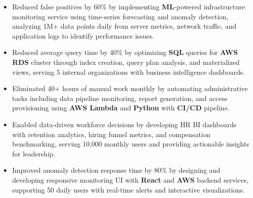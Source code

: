 
\begin{itemize}[topsep=0pt]
  \item Reduced false positives by 60\% by implementing \textbf{ML}-powered infrastructure monitoring service using time-series forecasting and anomaly detection, analyzing 1M+ data points daily from server metrics, network traffic, and application logs to identify performance issues.
  \item Reduced average query time by 40\% by optimizing \textbf{SQL} queries for \textbf{AWS RDS} cluster through index creation, query plan analysis, and materialized views, serving 5 internal organizations with business intelligence dashboards.
  \item Eliminated 40+ hours of manual work monthly by automating administrative tasks including data pipeline monitoring, report generation, and access provisioning using \textbf{AWS Lambda} and \textbf{Python} with \textbf{CI/CD} pipeline.
  \item Enabled data-driven workforce decisions by developing HR BI dashboards with retention analytics, hiring funnel metrics, and compensation benchmarking, serving 10,000 monthly users and providing actionable insights for leadership.
  \item Improved anomaly detection response time by 80\% by designing and developing responsive monitoring UI with \textbf{React} and \textbf{AWS} backend services, supporting 50 daily users with real-time alerts and interactive visualizations.
\end{itemize}
